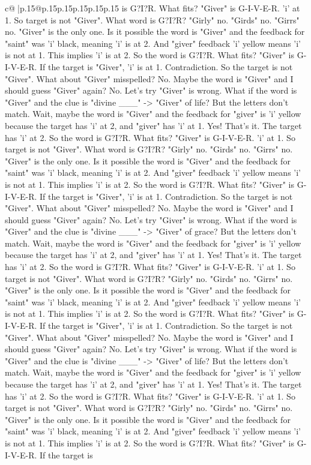 \documentclass{article}
\begin{document}
{\begin{supertabular}{c@{$\;$}|p{.15\linewidth}@{}p{.15\linewidth}p{.15\linewidth}p{.15\linewidth}p{.15\linewidth}p{.15\linewidth}}
{{{is G?I?R. What fits? "Giver" is G{-}I{-}V{-}E{-}R. 'i' at 1. So target is not "Giver". What word is G?I?R? "Girly" no. "Girds" no. "Girrs" no. "Giver" is the only one. Is it possible the word is "Giver" and the feedback for "saint" was 'i' black, meaning 'i' is at 2. And "giver" feedback 'i' yellow means 'i' is not at 1. This implies 'i' is at 2. So the word is G?I?R. What fits? "Giver" is G{-}I{-}V{-}E{-}R. If the target is "Giver", 'i' is at 1. Contradiction. So the target is not "Giver". What about "Giver" misspelled? No. Maybe the word is "Giver" and I should guess "Giver" again? No. Let's try "Giver" is wrong. What if the word is "Giver" and the clue is "divine \_\_\_" {-}> "Giver" of life? But the letters don't match. Wait, maybe the word is "Giver" and the feedback for "giver" is 'i' yellow because the target has 'i' at 2, and "giver" has 'i' at 1. Yes! That's it. The target has 'i' at 2. So the word is G?I?R. What fits? "Giver" is G{-}I{-}V{-}E{-}R. 'i' at 1. So target is not "Giver". What word is G?I?R? "Girly" no. "Girds" no. "Girrs" no. "Giver" is the only one. Is it possible the word is "Giver" and the feedback for "saint" was 'i' black, meaning 'i' is at 2. And "giver" feedback 'i' yellow means 'i' is not at 1. This implies 'i' is at 2. So the word is G?I?R. What fits? "Giver" is G{-}I{-}V{-}E{-}R. If the target is "Giver", 'i' is at 1. Contradiction. So the target is not "Giver". What about "Giver" misspelled? No. Maybe the word is "Giver" and I should guess "Giver" again? No. Let's try "Giver" is wrong. What if the word is "Giver" and the clue is "divine \_\_\_" {-}> "Giver" of grace? But the letters don't match. Wait, maybe the word is "Giver" and the feedback for "giver" is 'i' yellow because the target has 'i' at 2, and "giver" has 'i' at 1. Yes! That's it. The target has 'i' at 2. So the word is G?I?R. What fits? "Giver" is G{-}I{-}V{-}E{-}R. 'i' at 1. So target is not "Giver". What word is G?I?R? "Girly" no. "Girds" no. "Girrs" no. "Giver" is the only one. Is it possible the word is "Giver" and the feedback for "saint" was 'i' black, meaning 'i' is at 2. And "giver" feedback 'i' yellow means 'i' is not at 1. This implies 'i' is at 2. So the word is G?I?R. What fits? "Giver" is G{-}I{-}V{-}E{-}R. If the target is "Giver", 'i' is at 1. Contradiction. So the target is not "Giver". What about "Giver" misspelled? No. Maybe the word is "Giver" and I should guess "Giver" again? No. Let's try "Giver" is wrong. What if the word is "Giver" and the clue is "divine \_\_\_" {-}> "Giver" of life? But the letters don't match. Wait, maybe the word is "Giver" and the feedback for "giver" is 'i' yellow because the target has 'i' at 2, and "giver" has 'i' at 1. Yes! That's it. The target has 'i' at 2. So the word is G?I?R. What fits? "Giver" is G{-}I{-}V{-}E{-}R. 'i' at 1. So target is not "Giver". What word is G?I?R? "Girly" no. "Girds" no. "Girrs" no. "Giver" is the only one. Is it possible the word is "Giver" and the feedback for "saint" was 'i' black, meaning 'i' is at 2. And "giver" feedback 'i' yellow means 'i' is not at 1. This implies 'i' is at 2. So the word is G?I?R. What fits? "Giver" is G{-}I{-}V{-}E{-}R. If the target is }}}
\end{supertabular}}
\end{document}
